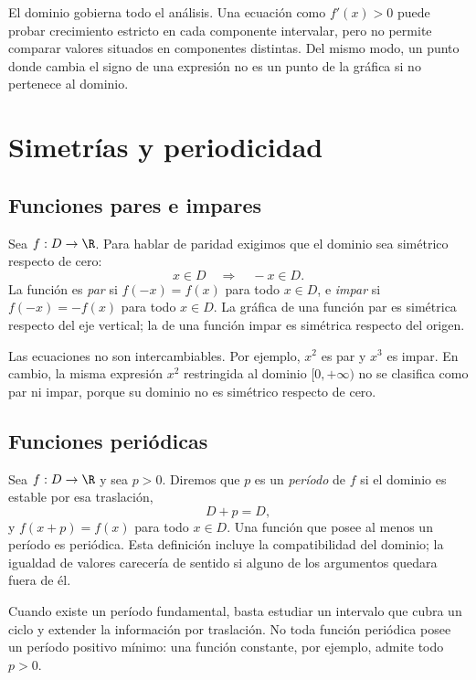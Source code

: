 El dominio gobierna todo el análisis. Una ecuación como \(f'(x)>0\) puede
probar crecimiento estricto en cada componente intervalar, pero no permite
comparar valores situados en componentes distintas. Del mismo modo, un punto
donde cambia el signo de una expresión no es un punto de la gráfica si no
pertenece al dominio.

\section{Simetrías y periodicidad}
\label{sec:simetrias-periodicidad}

\subsection{Funciones pares e impares}

Sea \(f:D\to\R\). Para hablar de paridad exigimos que el dominio sea
simétrico respecto de cero:
\[
  x\in D \quad\Longrightarrow\quad -x\in D.
\]
La función es \emph{par} si \(f(-x)=f(x)\) para todo \(x\in D\), e
\emph{impar} si \(f(-x)=-f(x)\) para todo \(x\in D\). La gráfica de una
función par es simétrica respecto del eje vertical; la de una función impar
es simétrica respecto del origen.

Las ecuaciones no son intercambiables. Por ejemplo, \(x^2\) es par y \(x^3\)
es impar. En cambio, la misma expresión \(x^2\) restringida al dominio
\([0,+\infty)\) no se clasifica como par ni impar, porque su dominio no es
simétrico respecto de cero.

\subsection{Funciones periódicas}

Sea \(f:D\to\R\) y sea \(p>0\). Diremos que \(p\) es un \emph{período} de
\(f\) si el dominio es estable por esa traslación,
\[
  D+p=D,
\]
y \(f(x+p)=f(x)\) para todo \(x\in D\). Una función que posee al menos un
período es periódica. Esta definición incluye la compatibilidad del dominio;
la igualdad de valores carecería de sentido si alguno de los argumentos
quedara fuera de él.

Cuando existe un período fundamental, basta estudiar un intervalo que cubra
un ciclo y extender la información por traslación. No toda función periódica
posee un período positivo mínimo: una función constante, por ejemplo, admite
todo \(p>0\).

